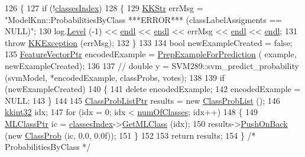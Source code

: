 \begin{DoxyCode}
126 \{
127   \textcolor{keywordflow}{if}  (!\hyperlink{class_k_k_m_l_l_1_1_model_adbb9475e16bb2c3eef52170485e3018e}{classesIndex})
128   \{
129     \hyperlink{class_k_k_b_1_1_k_k_str}{KKStr} errMsg = \textcolor{stringliteral}{"ModelKnn::ProbabilitiesByClass   ***ERROR***      (classLabelAssigments == NULL)"};
130     log.\hyperlink{class_k_k_b_1_1_run_log_a32cf761d7f2e747465fd80533fdbb659}{Level} (-1) << \hyperlink{namespace_k_k_b_ad1f50f65af6adc8fa9e6f62d007818a8}{endl} << \hyperlink{namespace_k_k_b_ad1f50f65af6adc8fa9e6f62d007818a8}{endl} << errMsg << \hyperlink{namespace_k_k_b_ad1f50f65af6adc8fa9e6f62d007818a8}{endl} << \hyperlink{namespace_k_k_b_ad1f50f65af6adc8fa9e6f62d007818a8}{endl};
131     \textcolor{keywordflow}{throw} \hyperlink{class_k_k_b_1_1_k_k_exception}{KKException} (errMsg);
132   \}
133 
134   \textcolor{keywordtype}{bool}  newExampleCreated = \textcolor{keyword}{false};
135   \hyperlink{class_k_k_m_l_l_1_1_feature_vector}{FeatureVectorPtr}  encodedExample = \hyperlink{class_k_k_m_l_l_1_1_model_a31b972adfb64769b3ae966debec824fd}{PrepExampleForPrediction} (
      example, newExampleCreated);
136 
137   \textcolor{comment}{//  double  y = SVM289::svm\_predict\_probability (svmModel,  *encodedExample, classProbs, votes);}
138 
139   \textcolor{keywordflow}{if}  (newExampleCreated)
140   \{
141     \textcolor{keyword}{delete} encodedExample;
142     encodedExample = NULL;
143   \}
144 
145   \hyperlink{class_k_k_m_l_l_1_1_class_prob_list}{ClassProbListPtr}  results = \textcolor{keyword}{new} \hyperlink{class_k_k_m_l_l_1_1_class_prob_list}{ClassProbList} ();
146   \hyperlink{namespace_k_k_b_a8fa4952cc84fda1de4bec1fbdd8d5b1b}{kkint32} idx;
147   \textcolor{keywordflow}{for}  (idx = 0;  idx < \hyperlink{class_k_k_m_l_l_1_1_model_ad41340e916a5ccdae7ed38d9546a8445}{numOfClasses};  idx++)
148   \{
149     \hyperlink{class_k_k_m_l_l_1_1_m_l_class}{MLClassPtr}  ic = \hyperlink{class_k_k_m_l_l_1_1_model_adbb9475e16bb2c3eef52170485e3018e}{classesIndex}->\hyperlink{class_k_k_m_l_l_1_1_m_l_class_index_list_af8d2827c2ea25d27a74edc1715aadca5}{GetMLClass} (idx);
150     results->\hyperlink{class_k_k_m_l_l_1_1_class_prob_list_a9fd88e9e49fd9b46142f1557d74e56ed}{PushOnBack} (\textcolor{keyword}{new} \hyperlink{class_k_k_m_l_l_1_1_class_prob}{ClassProb} (ic, 0.0, 0.0f));
151   \}
152 
153   \textcolor{keywordflow}{return}  results;
154 \}  \textcolor{comment}{/* ProbabilitiesByClass */}
\end{DoxyCode}
